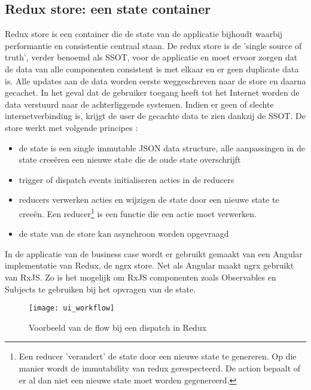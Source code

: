 \subsection{Redux store: een state container}
Redux store is een container die de state van de applicatie bijhoudt waarbij performantie en consistentie centraal staan. De redux store is de 'single source of truth', verder benoemd als SSOT, voor de applicatie en moet ervoor zorgen dat de data van alle componenten consistent is met elkaar en er geen duplicate data is. Alle updates aan de data worden eerste weggeschreven naar de store en daarna gecachet. In het geval dat de gebruiker toegang heeft tot het Internet worden de data verstuurd naar de achterliggende systemen. Indien er geen of slechte internetverbinding is, krijgt de user de gecachte data te zien dankzij de SSOT. De store werkt met volgende \autocite{ngrx-info} principes :
\begin{itemize}  
\item de state is een single immutable JSON data structure, alle aanpassingen in de state cree\"eren een nieuwe state die de oude state overschrijft
\item trigger of dispatch events initialiseren acties in de reducers
\item reducers verwerken acties en wijzigen de state door een nieuwe state te cree\"en. Een reducer\footnote{Een reducer 'verandert' de state door een nieuwe state te genereren. Op die manier wordt de immutability van redux gerespecteerd. De action bepaalt of er al dan niet een nieuwe state moet worden gegenereerd.} is een functie die een actie moet verwerken.
\item de state van de store kan asynchroon worden opgevraagd
\end{itemize}
In de applicatie van de business case wordt er gebruikt gemaakt van een Angular implementatie van Redux, de ngrx store. Net als Angular maakt ngrx gebruikt van RxJS. Zo is het mogelijk om RxJS componenten zoals Observables en Subjects te gebruiken bij het opvragen van de state.
\begin{figure}[h]
\caption{Voorbeeld\autocite{david-meents-redux} van de flow bij een dispatch in Redux}
\centering
\texttt{[image: ui\_workflow]}
\end{figure}
\clearpage
